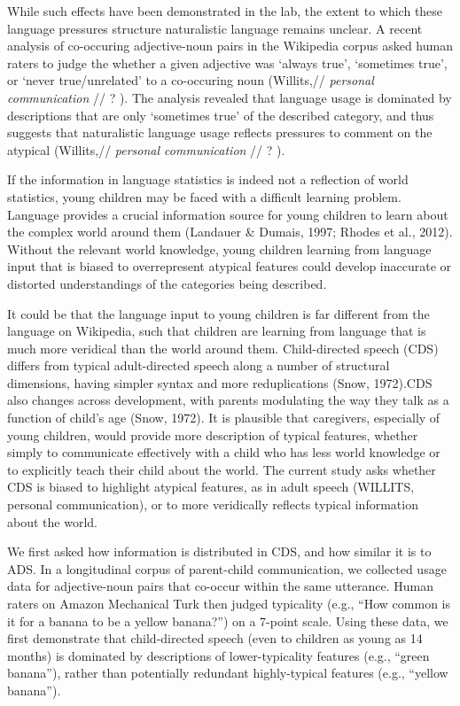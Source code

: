 \documentclass[10pt, letterpaper]{article}
\begin{document}
While such effects have been demonstrated in the lab, the extent to
which these language pressures structure naturalistic language remains
unclear. A recent analysis of co-occuring adjective-noun pairs in the
Wikipedia corpus asked human raters to judge the whether a given
adjective was `always true', `sometimes true', or `never true/unrelated'
to a co-occuring noun (Willits,// \emph{personal communication } // ? ).
The analysis revealed that language usage is dominated by descriptions
that are only `sometimes true' of the described category, and thus
suggests that naturalistic language usage reflects pressures to comment
on the atypical (Willits,// \emph{personal communication } // ? ).

If the information in language statistics is indeed not a reflection of
world statistics, young children may be faced with a difficult learning
problem. Language provides a crucial information source for young
children to learn about the complex world around them (Landauer \&
Dumais, 1997; Rhodes et al., 2012). Without the relevant world
knowledge, young children learning from language input that is biased to
overrepresent atypical features could develop inaccurate or distorted
understandings of the categories being described.

It could be that the language input to young children is far different
from the language on Wikipedia, such that children are learning from
language that is much more veridical than the world around them.
Child-directed speech (CDS) differs from typical adult-directed speech
along a number of structural dimensions, having simpler syntax and more
reduplications (Snow, 1972).CDS also changes across development, with
parents modulating the way they talk as a function of child's age (Snow,
1972). It is plausible that caregivers, especially of young children,
would provide more description of typical features, whether simply to
communicate effectively with a child who has less world knowledge or to
explicitly teach their child about the world. The current study asks
whether CDS is biased to highlight atypical features, as in adult speech
(WILLITS, personal communication), or to more veridically reflects
typical information about the world.

We first asked how information is distributed in CDS, and how similar it
is to ADS. In a longitudinal corpus of parent-child communication, we
collected usage data for adjective-noun pairs that co-occur within the
same utterance. Human raters on Amazon Mechanical Turk then judged
typicality (e.g., ``How common is it for a banana to be a yellow
banana?'') on a 7-point scale. Using these data, we first demonstrate
that child-directed speech (even to children as young as 14 months) is
dominated by descriptions of lower-typicality features (e.g., ``green
banana''), rather than potentially redundant highly-typical features
(e.g., ``yellow banana'').
\end{document}
